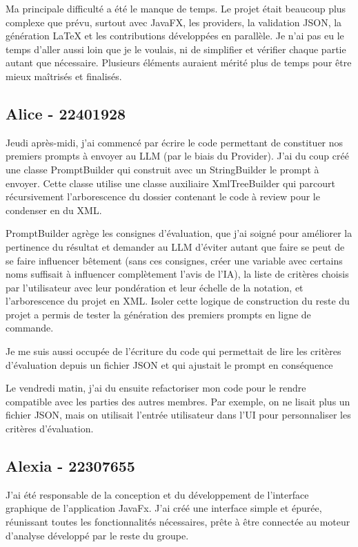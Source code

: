 \documentclass[11pt,a4paper]{article}
\begin{document}
Ma principale difficulté a été le manque de temps. Le projet était beaucoup plus complexe que prévu, surtout avec JavaFX, les providers, la validation JSON, la génération LaTeX et les contributions développées en parallèle. Je n’ai pas eu le temps d’aller aussi loin que je le voulais, ni de simplifier et vérifier chaque partie autant que nécessaire. Plusieurs éléments auraient mérité plus de temps pour être mieux maîtrisés et finalisés.

\subsection*{Alice - 22401928}
Jeudi après-midi, j’ai commencé par écrire le code permettant de constituer nos premiers prompts à envoyer au LLM (par le biais du Provider). J’ai du coup créé une classe PromptBuilder qui construit avec un StringBuilder le prompt à envoyer. Cette classe utilise une classe auxiliaire XmlTreeBuilder qui parcourt récursivement l’arborescence du dossier contenant le code à review pour le condenser en du XML.

PromptBuilder agrège les consignes d’évaluation, que j’ai soigné pour améliorer la pertinence du résultat et demander au LLM d’éviter autant que faire se peut de se faire influencer bêtement (sans ces consignes, créer une variable avec certains noms suffisait à influencer complètement l’avis de l’IA), la liste de critères choisis par l’utilisateur avec leur pondération et leur échelle de la notation, et l’arborescence du projet en XML. Isoler cette logique de construction du reste du projet a permis de tester la génération des premiers prompts en ligne de commande.

Je me suis aussi occupée de l’écriture du code qui permettait de lire les critères d’évaluation depuis un fichier JSON et qui ajustait le prompt en conséquence

Le vendredi matin, j’ai du ensuite refactoriser mon code pour le rendre compatible avec les parties des autres membres. Par exemple, on ne lisait plus un fichier JSON, mais on utilisait l’entrée utilisateur dans l’UI pour personnaliser les critères d’évaluation.

\subsection*{Alexia - 22307655}
J'ai été responsable de la conception et du développement de l'interface graphique de l'application JavaFx. J'ai créé une interface simple et épurée, réunissant toutes les fonctionnalités nécessaires, prête à être connectée au moteur d'analyse développé par le reste du groupe.
\end{document}
